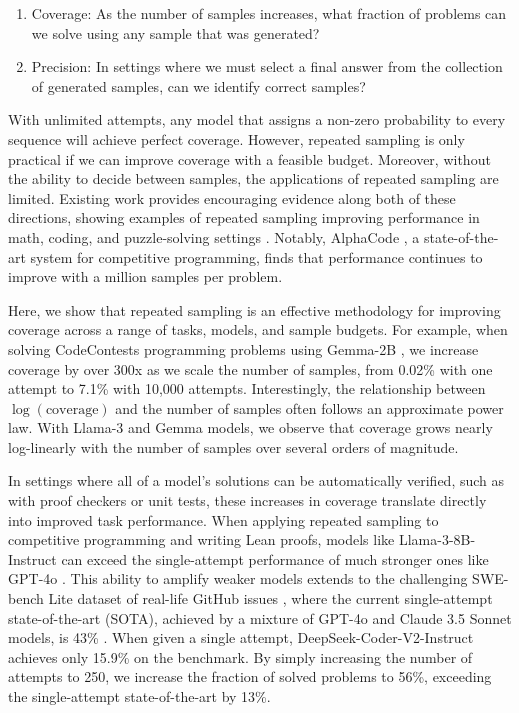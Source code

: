 \documentclass[11pt]{article}
\begin{document}
\begin{enumerate}
    \item Coverage: As the number of samples increases, what fraction of problems can we solve using any sample that was generated?
    \item Precision: In settings where we must select a final answer from the collection of generated samples, can we identify correct samples?
\end{enumerate}


With unlimited attempts, any model that assigns a non-zero probability to every sequence will achieve perfect coverage. However, repeated sampling is only practical if we can improve coverage with a feasible budget.
Moreover, without the ability to decide between samples, the applications of repeated sampling are limited. Existing work provides encouraging evidence along both of these directions, showing examples of repeated sampling improving performance in math, coding, and puzzle-solving settings \cite{wang2023selfconsistency, rozière2023codellamaopenfoundation, arc_gpt4o}. Notably, AlphaCode \cite{Li_2022}, a state-of-the-art system for competitive programming, finds that performance continues to improve with a million samples per problem. 


Here, we show that repeated sampling is an effective methodology for improving coverage across a range of tasks, models, and sample budgets.
For example, when solving CodeContests \cite{Li_2022} programming problems using Gemma-2B \cite{gemmateam2024gemmaopenmodelsbased}, we increase coverage by over 300x as we scale the number of samples, from 0.02\% with one attempt to 7.1\% with 10,000 attempts.  
Interestingly, the relationship between $\log(\text{coverage})$ and the number of samples often follows an approximate power law. With Llama-3  \cite{metallama} and Gemma models, we observe that coverage grows nearly log-linearly with the number of samples over several orders of magnitude.


In settings where all of a model’s solutions can be automatically verified, such as with proof checkers or unit tests, these increases in coverage translate directly into improved task performance. When applying repeated sampling to competitive programming and writing Lean proofs, models like Llama-3-8B-Instruct can exceed the single-attempt performance of much stronger ones like GPT-4o \cite{gpt4o}. This ability to amplify weaker models extends to the challenging SWE-bench Lite dataset of real-life GitHub issues \cite{jimenez2024swebenchlanguagemodelsresolve}, where the current single-attempt state-of-the-art (SOTA), achieved by a mixture of GPT-4o and Claude 3.5 Sonnet models, is 43\% \cite{aide}. When given a single attempt, DeepSeek-Coder-V2-Instruct \cite{deepseekai2024deepseekv2strongeconomicalefficient} achieves only 15.9\% on the benchmark. By simply increasing the number of attempts to 250, we increase the fraction of solved problems to 56\%, exceeding the single-attempt state-of-the-art by 13\%. 
\end{document}
